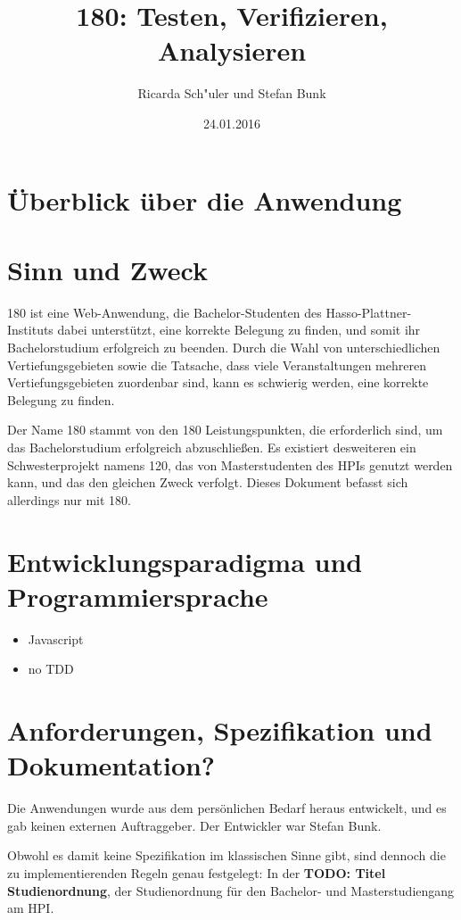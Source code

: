 \documentclass[ngerman]{article}
\title{180: Testen, Verifizieren, Analysieren}
\author{Ricarda Sch"uler und Stefan Bunk}
\date{24.01.2016}
\begin{document}
\listoftodos
\tableofcontents

\section{Überblick über die Anwendung}
\label{sec:ueberblick}

\section{Sinn und Zweck}\label{sinn-und-zweck}

180 ist eine Web-Anwendung, die Bachelor-Studenten des
Hasso-Plattner-Instituts dabei unterstützt, eine korrekte Belegung zu
finden, und somit ihr Bachelorstudium erfolgreich zu beenden. Durch die
Wahl von unterschiedlichen Vertiefungsgebieten sowie die Tatsache, dass
viele Veranstaltungen mehreren Vertiefungsgebieten zuordenbar sind, kann
es schwierig werden, eine korrekte Belegung zu finden.

Der Name 180 stammt von den 180 Leistungspunkten, die erforderlich sind,
um das Bachelorstudium erfolgreich abzuschließen. Es existiert
desweiteren ein Schwesterprojekt namens 120, das von Masterstudenten des
HPIs genutzt werden kann, und das den gleichen Zweck verfolgt. Dieses
Dokument befasst sich allerdings nur mit 180.

\section{Entwicklungsparadigma und
Programmiersprache}\label{entwicklungsparadigma-und-programmiersprache}

\begin{itemize}
    \item Javascript
    \item no TDD
\end{itemize}

\section{Anforderungen, Spezifikation und Dokumentation?}

Die Anwendungen wurde aus dem persönlichen Bedarf heraus entwickelt, und
es gab keinen externen Auftraggeber. Der Entwickler war Stefan Bunk.

Obwohl es damit keine Spezifikation im klassischen Sinne gibt, sind
dennoch die zu implementierenden Regeln genau festgelegt: In der
\textbf{TODO: Titel Studienordnung}, der Studienordnung für den
Bachelor- und Masterstudiengang am HPI.
\end{document}
